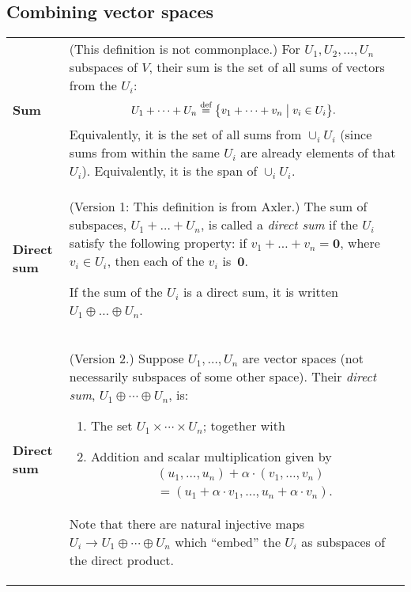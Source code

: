 \documentclass[10pt, a4paper, landscape]{article}
\newcommand{\defn}[1]{\textbf{#1}}
\newcommand{\isdef}{\stackrel{\text{def}}{=}}
\begin{document}
\begin{multicols*}{3}
\section*{Combining vector spaces}
\begin{tabularx}{\columnwidth}{@{}l>{\raggedright\arraybackslash}X@{}}
  \toprule
  
  \defn{Sum} & (This definition is not commonplace.) For $U_1, U_2,
  \dotsc, U_n$ subspaces of $V$, their sum is the set of all sums of vectors from the $U_i$:
  \begin{equation*}
    U_1+\dots +U_n \isdef \bigl\{ v_1 + \dots + v_n \bigm\vert v_i \in U_i \bigr\}.
  \end{equation*}
  Equivalently, it is the set of all sums from $\cup_i U_i$ (since sums
  from within the same $U_i$ are already elements of that
  $U_i$). Equivalently, it is the span of $\cup_i U_i$. \\
  
  \defn{Direct sum} & (Version 1: This definition is from Axler.) The
  sum of subspaces, $U_1+\dots + U_n$, is called a \emph{direct sum} if
  the $U_i$ satisfy the following property: if $v_1+\dots +v_n =
  \mathbold{0}$, where $v_i\in U_i$, then each of the $v_i$
  is~$\mathbold{0}$.

  If the sum of the $U_i$ is a direct sum, it is written $U_1\oplus \dots\oplus U_n$. \\

  \defn{Direct sum} & (Version 2.) Suppose $U_1, \dotsc, U_n$ are vector spaces (not necessarily subspaces of some other space). Their \emph{direct sum}, $U_1\oplus \dotsb \oplus U_n$, is:
  \begin{enumerate}
  \item The set $U_1\times\dotsb \times U_n$; together with 
  \item Addition and scalar multiplication given by
      \begin{multline*}
        (u_1, \dotsc, u_n) + \alpha\cdot (v_1, \dotsc, v_n) \\
        = (u_1 + \alpha\cdot v_1, \dotsc, u_n + \alpha\cdot v_n).
      \end{multline*}
  \end{enumerate}
  Note that there are natural injective maps $U_i\to U_1\oplus\dotsb\oplus U_n$ which “embed” the $U_i$ as subspaces of the direct product. 

  \\
  
\end{tabularx}


\end{multicols*}
\end{document}
